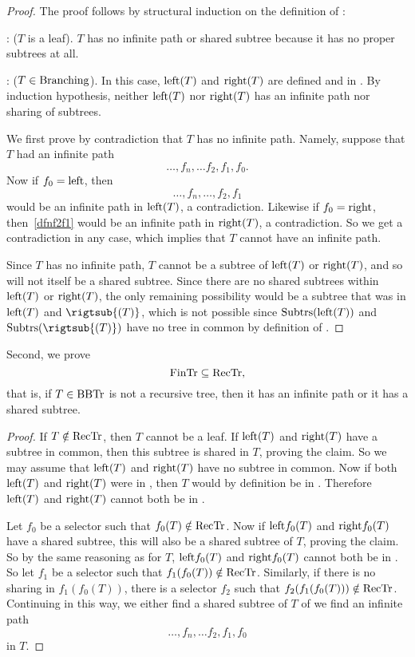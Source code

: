 \begin{proof}
The proof follows by structural induction on the
definition of \rectr:

: ($T$ is a leaf).  $T$ has no infinite path
or shared subtree because it has no proper subtrees at all.

: ($T \in \text{Branching}$).  In this case,
$\text{left}(T)$ and $\text{right}(T)$ are defined and in \rectr.  By
induction hypothesis, neither $\text{left}(T)$ nor $\text{right}(T)$ has an
infinite path nor sharing of subtrees.

We first prove by contradiction that $T$ has no infinite path.
Namely, suppose that $T$ had an infinite path
\[
\dots,f_n,\dots f_2,f_1,f_0.
\]
Now if $f_0 = \leftsub$, then
\begin{equation}\label{dfnf2f1}
\dots,f_n,\dots,f_2,f_1
\end{equation}
would be an infinite path in $\text{left}(T)$, a contradiction.  Likewise
if $f_0 = \rightsub$, then~\eqref{dfnf2f1} would be an infinite path
in $\text{right}(T)$, a contradiction.  So we get a contradiction in any
case, which implies that $T$ cannot have an infinite path.

Since $T$ has no infinite path, $T$ cannot be a subtree of
$\text{left}(T)$ or $\text{right}(T)$, and so will not itself be a
shared subtree.  Since there are no shared subtrees within
$\text{left}(T)$ or $\text{right}(T)$, the only remaining possibility
would be a subtree that was in $\text{left}(T)$ and $\rigtsub{(T)}$,
which is not possible since $\text{Subtrs}(\text{left}(T))$ and
$\subbrn{\rigtsub{(T)}}$ have no tree in common by definition of
\rectr.
\end{proof}

Second, we prove
\begin{equation}\label{fintrsubrectr}
\text{FinTr} \subseteq \text{RecTr},
\end{equation}
that is, if $T \in \text{BBTr}$ is not a recursive tree, then it has an
infinite path or it has a shared subtree.

\begin{proof}
If $T \notin \text{RecTr}$, then $T$ cannot be a leaf.  If $\text{left}(T)$
and $\text{right}(T)$ have a subtree in common, then this subtree is
shared in $T$, proving the claim.  So we may assume that
$\text{left}(T)$ and $\text{right}(T)$ have no subtree in common.  Now
if both $\text{left}(T)$ and $\text{right}(T)$ were in \rectr, then $T$
would by definition be in \rectr.  Therefore $\text{left}(T)$ and $\text{right}(T)$
cannot both be in \rectr.

Let $f_0$ be a selector such that $f_0(T) \notin \text{RecTr}$.  Now if
$\text{left}f_0(T)$ and $\text{right}f_0(T)$ have a shared subtree, this
will also be a shared subtree of $T$, proving the claim.  So by the
same reasoning as for $T$, $\text{left}f_0(T)$ and $\text{right}f_0(T)$
cannot both be in \rectr.  So let $f_1$ be a selector such that
$f_1(f_0(T)) \notin \text{RecTr}$.  Similarly, if there is no sharing in
$f_1(f_0(T))$, there is a selector $f_2$ such that $f_2(f_1(f_0(T)))
\notin \text{RecTr}$.  Continuing in this way, we either find a shared subtree of $T$ of we
find an infinite path
\[
\dots,f_n,\dots f_2,f_1,f_0
\]
in $T$.
\end{proof}

